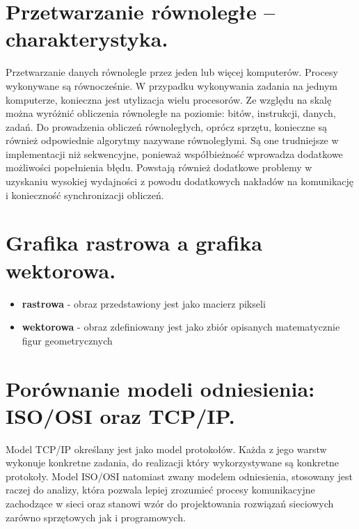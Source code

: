 \documentclass[12pt,a4paper]{article}
\begin{document}
	\section{Przetwarzanie równoległe – charakterystyka.}
	Przetwarzanie danych równolegle przez jeden lub więcej komputerów. Procesy wykonywane są równocześnie. W przypadku wykonywania zadania na jednym komputerze, konieczna jest utylizacja wielu procesorów. Ze względu na skalę można wyróżnić obliczenia równoległe na poziomie: bitów, instrukcji, danych, zadań. Do prowadzenia obliczeń równoległych, oprócz sprzętu, konieczne są również odpowiednie algorytmy nazywane równoległymi. Są one trudniejsze w implementacji niż sekwencyjne, ponieważ współbieżność wprowadza dodatkowe możliwości popełnienia błędu. Powstają również dodatkowe problemy w uzyskaniu wysokiej wydajności z powodu dodatkowych nakładów na komunikację i konieczność synchronizacji obliczeń.

	\section{Grafika rastrowa a grafika wektorowa.}
	\begin{itemize}
		\item \textbf{rastrowa} - obraz przedstawiony jest jako macierz pikseli
		\item \textbf{wektorowa} - obraz zdefiniowany jest jako zbiór opisanych matematycznie figur geometrycznych
	\end{itemize}

	\section{Porównanie modeli odniesienia: ISO/OSI oraz TCP/IP.}
	Model TCP/IP określany jest jako model protokołów. Każda z jego warstw wykonuje konkretne zadania, do realizacji który wykorzystywane są konkretne protokoły. Model ISO/OSI natomiast zwany modelem odniesienia, stosowany jest raczej do analizy, która pozwala lepiej zrozumieć procesy komunikacyjne zachodzące w sieci oraz stanowi wzór do projektowania rozwiązań sieciowych zarówno sprzętowych jak i programowych.\\
	
\end{document}
